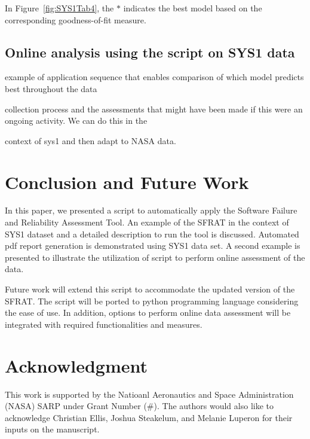 \documentclass[conference]{IEEEtran}
\begin{document}
\noindent In Figure~\ref{fig:SYS1Tab4}, the $*$ indicates the best model based on the corresponding goodness-of-fit measure.


\subsection{Online analysis using the script on SYS1 data}\label{sec:Ex:ScriptOnline}
example of application sequence that enables comparison of which model predicts best throughout the data

collection process and the assessments that might have been made if this were an ongoing activity. We can do this in the

context of sys1 and then adapt to NASA data.


\section{Conclusion and Future Work}\label{sec:Concl}
In this paper, we presented a script to automatically apply the Software Failure and Reliability Assessment Tool. An example of the SFRAT in the context of SYS1 dataset and a detailed description to run the tool is discussed. Automated pdf report generation is demonstrated using SYS1 data set. A second example is presented to illustrate the utilization of script to perform online assessment of the data. 

Future work will extend this script to accommodate the updated version of the SFRAT. The script will be ported to python programming language considering the ease of use. In addition, options to perform online data assessment will be integrated with required functionalities and measures.


\section*{Acknowledgment}\label{sec:Ack}
This work is supported by the Natioanl Aeronautics and Space Administration (NASA) SARP under Grant Number (\#). The authors would also like to acknowledge Christian Ellis, Joshua Steakelum, and Melanie Luperon for their inputs on the manuscript.




\end{document}
